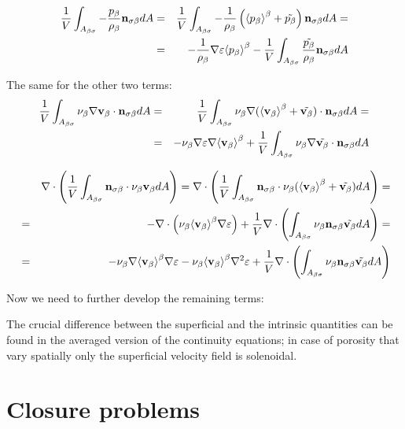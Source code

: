 \begin{eqnarray}
\dfrac{1}{V} \int_{A_{\beta \sigma}}  -\dfrac{p_{\beta}}{\rho_{\beta}} \mathbf{n}_{\sigma \beta} dA &=& \dfrac{1}{V} \int_{A_{\beta \sigma}}  -\dfrac{1}{\rho_{\beta}} \left({\left< p_{\beta} \right>}^{\beta}  + \tilde{p_{\beta}}\right) \mathbf{n}_{\sigma \beta} dA = \nonumber \\
&=& -\dfrac{1}{\rho_{\beta}}\nabla\varepsilon {\left< p_{\beta}\right>}^{\beta} - \dfrac{1}{V} \int_{A_{\beta \sigma}} \dfrac{\tilde{p_{\beta}}}{\rho_{\beta}} \mathbf{n}_{\sigma \beta} dA
\end{eqnarray}

The same for the other two terms:
\begin{eqnarray}
\dfrac{1}{V} \int_{A_{\beta \sigma}} \nu_{\beta} \nabla \textbf{v}_{\beta} \cdot \mathbf{n}_{\sigma \beta} dA &=& \dfrac{1}{V} \int_{A_{\beta \sigma}} \nu_{\beta} \nabla ({\left< \textbf{v}_{\beta} \right>}^{\beta} +\tilde{\textbf{v}_{\beta}}) \cdot \mathbf{n}_{\sigma \beta} dA =  \nonumber \\
&=& - \nu_{\beta} \nabla \varepsilon \nabla {\left< \textbf{v}_{\beta}\right>}^{\beta} + \dfrac{1}{V} \int_{A_{\beta \sigma}} \nu_{\beta} \nabla \tilde{\textbf{v}_{\beta}} \cdot \mathbf{n}_{\sigma \beta} dA
\end{eqnarray}

\begin{eqnarray}
&&\nabla \cdot \left( \dfrac{1}{V} \int_{A_{\beta \sigma}} \mathbf{n}_{\sigma \beta} \cdot \nu_{\beta} \textbf{v}_{\beta} dA \right) = \nabla \cdot \left( \dfrac{1}{V} \int_{A_{\beta \sigma}} \mathbf{n}_{\sigma \beta} \cdot \nu_{\beta} ({\left< \textbf{v}_{\beta} \right>}^{\beta} +\tilde{\textbf{v}_{\beta}}) dA \right) =  \nonumber \\
&=& -\nabla \cdot \left( \nu_{\beta} {\left< \textbf{v}_{\beta} \right>}^{\beta} \nabla \varepsilon \right) + \dfrac{1}{V} \nabla \cdot \left(\int_{A_{\beta \sigma}}  \nu_{\beta} \mathbf{n}_{\sigma \beta} \tilde{\textbf{v}_{\beta}} dA \right) =  \nonumber \\
&=& -\nu_{\beta}  \nabla  {\left< \textbf{v}_{\beta}\right>}^{\beta} \nabla \varepsilon -\nu_{\beta} {\left< \textbf{v}_{\beta} \right>}^{\beta} \nabla^2 \varepsilon + \dfrac{1}{V} \nabla \cdot \left(\int_{A_{\beta \sigma}}  \nu_{\beta} \mathbf{n}_{\sigma \beta} \tilde{\textbf{v}_{\beta}} dA \right)
\end{eqnarray}

Now we need to further develop the remaining terms:



The crucial difference between the superficial and the intrinsic quantities can be found in the averaged version of the continuity equations; in case of porosity that vary spatially only the superficial velocity field is solenoidal.


\section{Closure problems}


